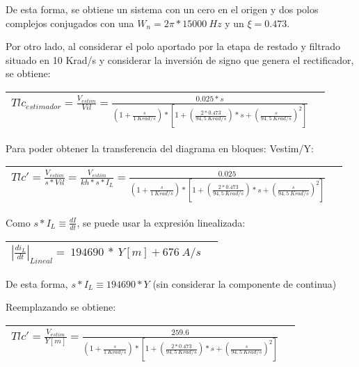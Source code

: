 \documentclass{article} %
\begin{document}
\noindent De esta forma, se obtiene un sistema con un cero en el origen y dos polos complejos conjugados con una $W_n=2\pi *15000\ Hz$ y un $\xi =0.473$.

\noindent 

\noindent Por otro lado, al considerar el polo aportado por la etapa de restado y filtrado situado en 10 Krad/s y considerar la inversi\'{o}n de signo que genera el rectificador, se obtiene:

\noindent 

\begin{tabular}{|p{3.9in}|p{0.4in}|} \hline 
${Tlc}_{estimador}=\frac{V_{estim}}{Vil}=\frac{0.025*s}{(1+\frac{s}{1\ Krad/s})*[1+(\frac{2*0.473}{94,5\ Krad/s})*s+(\frac{s}{94,5\ Krad/s})^2]}$ &   \\ \hline 
\end{tabular}



\noindent Para poder obtener la transferencia del diagrama en bloques: Vestim/Y:

\noindent 

\begin{tabular}{|p{3.9in}|p{0.4in}|} \hline 
${Tlc'}=\frac{V_{estim}}{s*Vil}=\frac{V_{estim}}{kh*s*I_L}=\frac{0.025}{(1+\frac{s}{1\ Krad/s})*[1+(\frac{2*0.473}{94,5\ Krad/s})*s+(\frac{s}{94,5\ Krad/s})^2]}$ &   \\ \hline 
\end{tabular}



\noindent Como $s*I_L\equiv \frac{dI}{dt}$, se puede usar la expresi\'{o}n linealizada:

\noindent 

\begin{tabular}{|p{3.9in}|p{0.4in}|} \hline 
${\left|\frac{{di}_L}{dt}\right|}_{Lineal}=\ 194690\ *\ Y[m]+676\ A/s$ &   \\ \hline 
\end{tabular}



\noindent De esta forma,  $s*I_L\equiv 194690*Y$ (sin considerar la componente de continua)

\noindent 

\noindent Reemplazando se obtiene:

 

\begin{tabular}{|p{3.9in}|p{0.4in}|} \hline 
${Tlc'}=\frac{V_{estim}}{Y[m]}=\frac{259.6}{(1+\frac{s}{1\ Krad/s})*[1+(\frac{2*0.473}{94,5\ Krad/s})*s+(\frac{s}{94,5\ Krad/s})^2]}$ &   \\ \hline 
\end{tabular}
\end{document}
